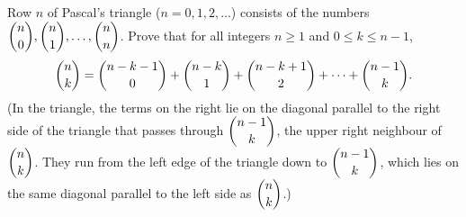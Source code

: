 Row $n$ of Pascal's triangle ($n=0,1,2,\dots$) consists of the numbers $\dbinom n0,\dbinom n1,\dots,\dbinom nn$. Prove that for all integers $n\ge1$ and $0\le k\le n-1$,
\[
\dbinom nk=\dbinom{n-k-1}{0}+\dbinom{n-k}{1}+\dbinom{n-k+1}{2}+\cdots+\dbinom{n-1}{k}.
\]
(In the triangle, the terms on the right lie on the diagonal parallel to the right side of the triangle that passes through $\dbinom{n-1}{k}$, the upper right neighbour of $\dbinom nk$. They run from the left edge of the triangle down to $\dbinom{n-1}{k}$, which lies on the same diagonal parallel to the left side as $\dbinom nk$.)
